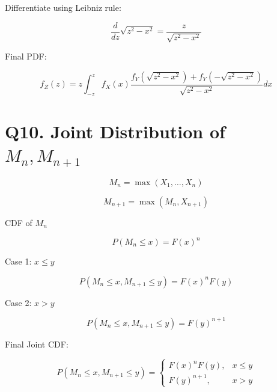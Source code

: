\documentclass{article}
\begin{document}
Differentiate using Leibniz rule:

\[
\frac{d}{dz}\sqrt{z^2 - x^2}
=
\frac{z}{\sqrt{z^2-x^2}}
\]

Final PDF:

\[
f_Z(z)
=
z
\int_{-z}^{z}
f_X(x)
\frac{
f_Y(\sqrt{z^2-x^2}) + f_Y(-\sqrt{z^2-x^2})
}
{\sqrt{z^2-x^2}}
dx
\]

\section*{Q10. Joint Distribution of $M_n, M_{n+1}$}

\[
M_n = \max(X_1,\dots,X_n)
\]

\[
M_{n+1} = \max(M_n, X_{n+1})
\]

CDF of $M_n$

\[
P(M_n \le x) = F(x)^n
\]

Case 1: $x \le y$

\[
P(M_n \le x, M_{n+1} \le y)
=
F(x)^n F(y)
\]

Case 2: $x > y$

\[
P(M_n \le x, M_{n+1} \le y)
=
F(y)^{n+1}
\]

Final Joint CDF:

\[
P(M_n \le x, M_{n+1} \le y)
=
\begin{cases}
F(x)^n F(y), & x \le y \\
F(y)^{n+1}, & x > y
\end{cases}
\]
\end{document}
